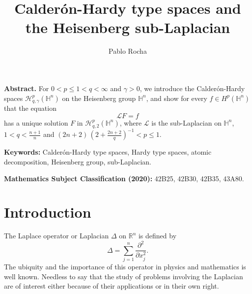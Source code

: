 \documentclass[reqno,10pt]{article}
\theoremstyle{definition}
\numberwithin{equation}{section}
\numberwithin{theorem}{section}
\newenvironment{OMabstract}{\noindent\textbf{Abstract.} }{\medskip}
\newenvironment{OMsubjclass}{\noindent\textbf{Mathematics Subject Classification (2020):} }{\medskip}
\newenvironment{OMkeywords}{\noindent\textbf{Keywords:}  }{\medskip}
\begin{document}
\author{Pablo Rocha} %
\title{Calder\'on-Hardy type spaces and the Heisenberg sub-Laplacian}
\maketitle


\begin{OMabstract}
For $0 < p \leq 1 < q < \infty$ and $\gamma > 0$, we introduce the Calder\'on-Hardy spaces $\mathcal{H}^{p}_{q, \gamma}(\mathbb{H}^{n})$ on the Heisenberg group $\mathbb{H}^{n}$, and show for every $f \in H^{p}(\mathbb{H}^{n})$ that the equation
\[
\mathcal{L} F = f
\]
has a unique solution $F$ in $\mathcal{H}^{p}_{q, 2}(\mathbb{H}^{n})$, where $\mathcal{L}$ is the sub-Laplacian on $\mathbb{H}^{n}$, 
$1 < q < \frac{n+1}{n}$ and $(2n+2) \, (2 + \frac{2n+2}{q})^{-1} < p \leq 1$.
\end{OMabstract}

\begin{OMkeywords}
Calder\'on-Hardy type spaces, Hardy type spaces, atomic decomposition, Heisenberg group, sub-Laplacian.
\end{OMkeywords}

\begin{OMsubjclass}
42B25, 42B30, 42B35, 43A80.
\end{OMsubjclass}


\section{Introduction}

The Laplace operator or Laplacian $\Delta$ on $\mathbb{R}^n$ is defined by
\[
\Delta = \sum_{j=1}^{n} \frac{\partial^2}{\partial x_j^2}.
\]
The ubiquity and the importance of this operator in physics and mathematics is well known. Needless to say that the study of problems involving the Laplacian are of interest either because of their applications or in their own right.
\end{document}
